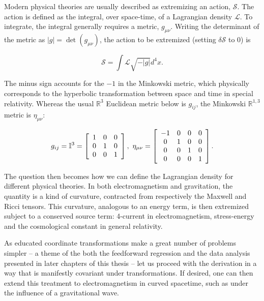Modern physical theories are usually described as extremizing an action, $\mathcal{S}$. 
The action is defined as the integral, over space-time, of a Lagrangian density $\mathcal{L}$. 
To integrate, the integral generally requires a metric, $g_{\mu\nu}$.
Writing the determinant of the metric as $|g| = \det(g_{\mu\nu})$, the action to be extremized (setting $\delta \mathcal{S}$ to 0) is

\begin{equation}
\mathcal{S} = \int \mathcal{L} \sqrt{-|g|} d^4 x.
\end{equation} 

The minus sign accounts for the $-1$ in the Minkowski metric, which physically corresponds to the hyperbolic transformation between space and time in special relativity.
Whereas the usual $\mathbb{R}^3$ Euclidean metric below is $g_{ij}$, the Minkowski $\mathbb{R}^{1,3}$ metric is $\eta_{\mu\nu}$:

\begin{eqnarray}
g_{ij} = \mathbb{I}^3 = 
\left[
\begin{array}{ccc}
1 & 0 & 0 \\
0 & 1 & 0 \\
0 & 0 & 1
\end{array} \right],
\textup{ }
\eta_{\mu\nu} =
\left[
\begin{array}{cccc}
-1 & 0 & 0 & 0\\
0 & 1 & 0 & 0 \\
0 & 0 & 1 & 0\\
0 & 0 & 0 & 1
\end{array} \right].
\end{eqnarray}


The question then becomes how we can define the Lagrangian density for different physical theories. 
In both electromagnetism and gravitation, the quantity is a kind of curvature, contracted from respectively the Maxwell and Ricci tensors. 
This curvature, analogous to an energy term, is then extremized subject to a conserved source term: 4-current in electromagnetism, stress-energy and the cosmological constant in general relativity.

As educated coordinate transformations make a great number of problems simpler -- a theme of the both the feedforward regression and the data analysis presented in later chapters of this thesis -- let us proceed with the derivation in a way that is manifestly covariant under transformations. If desired, one can then extend this treatment to electromagnetism in curved spacetime, such as under the influence of a gravitational wave. 

